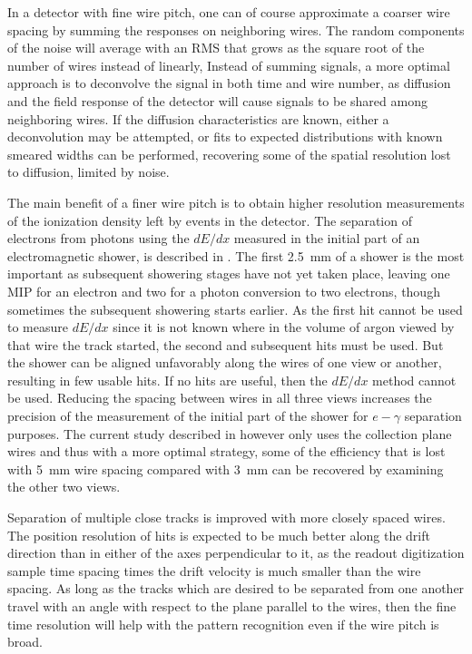 In a detector with fine wire pitch,
one can of course approximate a coarser wire spacing by summing the responses on neighboring
wires.  The random components of the noise will
average with an RMS that grows as the square root of the number of wires instead of linearly,
Instead of summing signals, a more optimal approach is to deconvolve the signal in both
time and wire number, as diffusion and the field response of the detector will cause
signals to be shared among neighboring wires.  If the diffusion characteristics are known,
either a deconvolution may be attempted, or fits to expected distributions with known
smeared widths can be performed, recovering some of the spatial resolution lost to diffusion,
limited by noise.

The main benefit of a finer wire pitch is to obtain higher resolution measurements of the
ionization density left by events in the detector.  The separation of electrons from
photons using the $dE/dx$ measured in the initial part of an electromagnetic shower, is
described in \anxreco.  The first 2.5~mm of a shower is the most important as subsequent
showering stages have not yet taken place, leaving one MIP for an electron and two for a photon
conversion to two electrons, though sometimes the subsequent showering starts earlier.
As the first hit cannot be used to measure $dE/dx$ since it is not known where in the volume
of argon viewed by that wire the track started, the second and subsequent hits must be used.
But the shower can be aligned unfavorably along the wires of one view or another, resulting
in few usable hits.  If no hits are useful, then the $dE/dx$ method cannot be used.  Reducing
the spacing between wires in all three views increases the precision of the measurement of the
initial part of the shower for $e-\gamma$ separation purposes.  The current study described
in \anxreco however only uses the collection plane wires and thus with a more optimal strategy,
some of the efficiency that is lost with 5~mm wire spacing compared with 3~mm can be recovered
by examining the other two views.

Separation of multiple close tracks
is improved with more closely spaced wires.  The position resolution of hits
is expected to be much better along the drift direction than in either of the axes perpendicular
to it, as the readout digitization sample time spacing times the drift velocity is much smaller
than the wire spacing.  As long as the tracks which are desired to be separated from one another
travel with an angle with respect to the plane parallel to the wires, then the fine time resolution
will help with the pattern recognition even if the wire pitch is broad.

